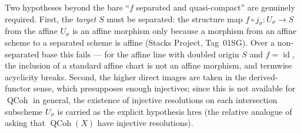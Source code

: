 \begin{lemma}
  Two hypotheses beyond the bare ``\(f\) separated and quasi-compact'' are genuinely
  required. First, the \emph{target} \(S\) must be separated: the structure map
  \(f \circ j_\sigma : U_\sigma \to S\) from the affine \(U_\sigma\) is an affine
  morphism only because a morphism from an affine scheme to a separated scheme is
  affine (Stacks Project, Tag~01SG). Over a non-separated base this fails --- for the
  affine line with doubled origin \(S\) and \(f = \operatorname{id}\), the inclusion
  of a standard affine chart is not an affine morphism, and termwise acyclicity
  breaks. Second, the higher direct images are taken in the derived-functor sense,
  which presupposes enough injectives; since this is not available for
  \(\operatorname{QCoh}\) in general, the existence of injective resolutions on each
  intersection subscheme \(U_\sigma\) is carried as the explicit hypothesis
  \(\mathrm{hres}\) (the relative analogue of asking that
  \(\operatorname{QCoh}(X)\) have injective resolutions).
\end{lemma}

